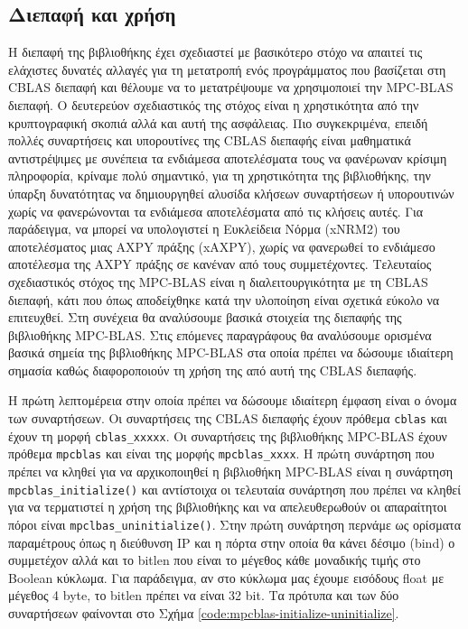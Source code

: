 \subsection{Διεπαφή και χρήση}

Η διεπαφή της βιβλιοθήκης έχει σχεδιαστεί με βασικότερο στόχο να απαιτεί τις ελάχιστες δυνατές αλλαγές για τη μετατροπή ενός προγράμματος που βασίζεται στη CBLAS διεπαφή και θέλουμε να το μετατρέψουμε να χρησιμοποιεί την MPC-BLAS διεπαφή. Ο δευτερεύον σχεδιαστικός της στόχος είναι η χρηστικότητα από την κρυπτογραφική σκοπιά αλλά και αυτή της ασφάλειας. Πιο συγκεκριμένα, επειδή πολλές συναρτήσεις και υπορουτίνες της CBLAS διεπαφής είναι μαθηματικά αντιστρέψιμες με συνέπεια τα ενδιάμεσα αποτελέσματα τους να φανέρωναν κρίσιμη πληροφορία, κρίναμε πολύ σημαντικό, για τη χρηστικότητα της βιβλιοθήκης, την ύπαρξη δυνατότητας να δημιουργηθεί αλυσίδα κλήσεων συναρτήσεων ή υπορουτινών χωρίς να φανερώνονται τα ενδιάμεσα αποτελέσματα από τις κλήσεις αυτές. Για παράδειγμα, να μπορεί να υπολογιστεί η Ευκλείδεια Νόρμα (xNRM2) του αποτελέσματος μιας AXPY πράξης (xAXPY), χωρίς να φανερωθεί το ενδιάμεσο αποτέλεσμα της AXPY πράξης σε κανέναν από τους συμμετέχοντες. Τελευταίος σχεδιαστικός στόχος της MPC-BLAS είναι η διαλειτουργικότητα με τη CBLAS διεπαφή, κάτι που όπως αποδείχθηκε κατά την υλοποίηση είναι σχετικά εύκολο να επιτευχθεί. Στη συνέχεια θα αναλύσουμε βασικά στοιχεία της διεπαφής της βιβλιοθήκης MPC-BLAS. Στις επόμενες παραγράφους θα αναλύσουμε ορισμένα βασικά σημεία της βιβλιοθήκης MPC-BLAS στα οποία πρέπει να δώσουμε ιδιαίτερη σημασία καθώς διαφοροποιούν τη χρήση της από αυτή της CBLAS διεπαφής.

Η πρώτη λεπτομέρεια στην οποία πρέπει να δώσουμε ιδιαίτερη έμφαση είναι ο όνομα των συναρτήσεων. Οι συναρτήσεις της CBLAS διεπαφής έχουν πρόθεμα \texttt{cblas} και έχουν τη μορφή \texttt{cblas_xxxxx}. Οι συναρτήσεις της βιβλιοθήκης MPC-BLAS έχουν πρόθεμα \texttt{mpcblas} και είναι της μορφής \texttt{mpcblas_xxxx}. Η πρώτη συνάρτηση που πρέπει να κληθεί για να αρχικοποιηθεί η βιβλιοθήκη MPC-BLAS είναι η συνάρτηση \texttt{mpcblas_initialize()} και αντίστοιχα οι τελευταία συνάρτηση που πρέπει να κληθεί για να τερματιστεί η χρήση της βιβλιοθήκης και να απελευθερωθούν οι απαραίτητοι πόροι είναι \texttt{mpclbas_uninitialize()}. Στην πρώτη συνάρτηση περνάμε ως ορίσματα παραμέτρους όπως η διεύθυνση IP και η πόρτα στην οποία θα κάνει δέσιμο (bind) ο συμμετέχον αλλά και το bitlen που είναι το μέγεθος κάθε μοναδικής τιμής στο Boolean κύκλωμα. Για παράδειγμα, αν στο κύκλωμα μας έχουμε εισόδους float με μέγεθος 4 byte, το bitlen πρέπει να είναι 32 bit. Τα πρότυπα και των δύο συναρτήσεων φαίνονται στο Σχήμα \ref{code:mpcblas-initialize-uninitialize}.

